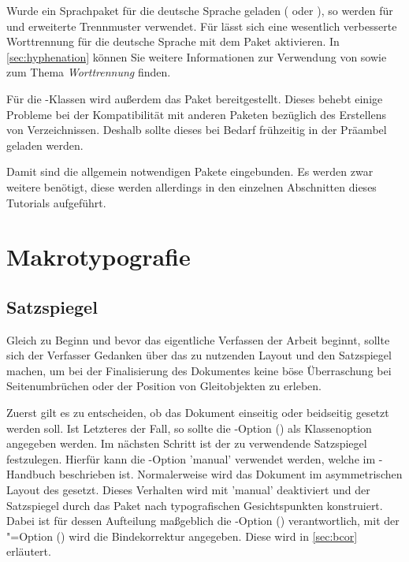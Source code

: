 \documentclass[%
  english,ngerman,%
  cdgeometry=no,DIV=12,%
  cd=false,cdfont=false,cdtitle=true,%
  headings=normal,%
  automark,%
  listof=toc,%
]{tudscrartcl}
\begin{document}
Wurde ein Sprachpaket für die deutsche Sprache geladen ( oder 
), so werden für  und  
erweiterte Trennmuster verwendet. Für  lässt sich eine 
wesentlich verbesserte Worttrennung für die deutsche Sprache mit dem Paket 
 aktivieren. In \autoref{sec:hyphenation} können Sie weitere 
Informationen zur Verwendung von  sowie zum Thema 
\emph{Worttrennung} finden.
%
\begin{Preamble}
\usepackage{iftex}
\iftutex
  \usepackage{fontspec}
\else
  \usepackage[T1]{fontenc}
  \usepackage[ngerman=ngerman-x-latest]{hyphsubst}
\fi
\end{Preamble}
%
Für die \KOMAScript-Klassen wird außerdem das Paket  
bereitgestellt. Dieses behebt einige Probleme bei der Kompatibilität mit 
anderen Paketen bezüglich des Erstellens von Verzeichnissen. Deshalb sollte 
dieses bei Bedarf frühzeitig in der Präambel geladen werden. 
%
\begin{Preamble}
\usepackage{scrhack}
\end{Preamble}
%
Damit sind die allgemein notwendigen Pakete eingebunden. Es werden zwar weitere 
benötigt, diese werden allerdings in den einzelnen Abschnitten dieses Tutorials 
aufgeführt.



\section{Makrotypografie}
\subsection{Satzspiegel}
Gleich zu Beginn und bevor das eigentliche Verfassen der Arbeit beginnt, sollte 
sich der Verfasser Gedanken über das zu nutzenden Layout und den Satzspiegel 
machen, um bei der Finalisierung des Dokumentes keine böse Überraschung bei 
Seitenumbrüchen oder der Position von Gleitobjekten zu erleben.

Zuerst gilt es zu entscheiden, ob das Dokument einseitig oder beidseitig 
gesetzt werden soll. Ist Letzteres der Fall, so sollte die \KOMAScript-Option 
() als Klassenoption angegeben werden. Im 
nächsten Schritt ist der zu verwendende Satzspiegel festzulegen. Hierfür kann 
die \TUDScript-Option 'manual' verwendet werden, welche im 
\TUDScript-Handbuch beschrieben ist. Normalerweise wird das Dokument im 
asymmetrischen Layout des \CDs gesetzt.
%
Dieses Verhalten wird mit 'manual' deaktiviert und 
der Satzspiegel durch das Paket  nach typografischen 
Gesichtspunkten konstruiert. Dabei ist für dessen Aufteilung maßgeblich die 
\KOMAScript-Option () verantwortlich, mit der 
\KOMAScript"=Option () wird die Bindekorrektur 
angegeben. Diese wird in \autoref{sec:bcor} erläutert.
\end{document}
